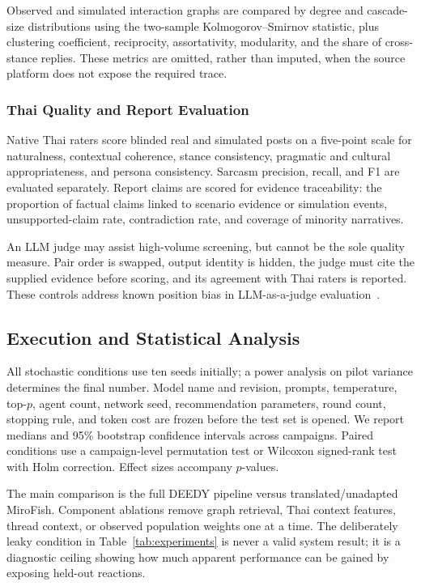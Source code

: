 \documentclass[conference]{IEEEtran}
\begin{document}
Observed and simulated interaction graphs are compared by degree and cascade-
size distributions using the two-sample Kolmogorov--Smirnov statistic, plus
clustering coefficient, reciprocity, assortativity, modularity, and the share
of cross-stance replies. These metrics are omitted, rather than imputed, when
the source platform does not expose the required trace.

\subsubsection{Thai Quality and Report Evaluation}

Native Thai raters score blinded real and simulated posts on a five-point scale
for naturalness, contextual coherence, stance consistency, pragmatic and
cultural appropriateness, and persona consistency. Sarcasm precision, recall,
and F1 are evaluated separately. Report claims are scored for evidence
traceability: the proportion of factual claims linked to scenario evidence or
simulation events, unsupported-claim rate, contradiction rate, and coverage of
minority narratives.

An LLM judge may assist high-volume screening, but cannot be the sole quality
measure. Pair order is swapped, output identity is hidden, the judge must cite
the supplied evidence before scoring, and its agreement with Thai raters is
reported. These controls address known position bias in LLM-as-a-judge
evaluation~\cite{shi2024judging}.

\subsection{Execution and Statistical Analysis}

All stochastic conditions use ten seeds initially; a power analysis on pilot
variance determines the final number. Model name and revision, prompts,
temperature, top-$p$, agent count, network seed, recommendation parameters,
round count, stopping rule, and token cost are frozen before the test set is
opened. We report medians and 95\% bootstrap confidence intervals across
campaigns. Paired conditions use a campaign-level permutation test or Wilcoxon
signed-rank test with Holm correction. Effect sizes accompany $p$-values.

The main comparison is the full DEEDY pipeline versus translated/unadapted
MiroFish. Component ablations remove graph retrieval, Thai context features,
thread context, or observed population weights one at a time. The deliberately
leaky condition in Table~\ref{tab:experiments} is never a valid system result;
it is a diagnostic ceiling showing how much apparent performance can be gained
by exposing held-out reactions.
\end{document}
